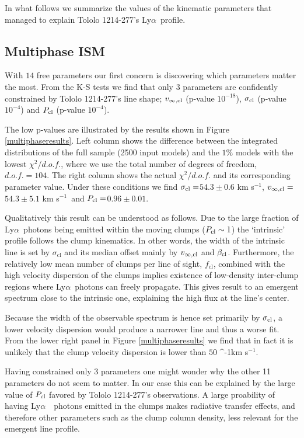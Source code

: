 \documentclass[a4paper,fleqn,usenatbib]{mnras}
\newcommand{\tol}{Tololo 1214-277}
\newcommand{\lya}{\ifmmode{{\rm Ly}\alpha}\else Ly$\alpha$\ \fi}
\newcommand{\kms}{\ifmmode\mathrm{km\ s}^{-1}\else km s$^{-1}$\fi}
\newcommand{\sigmaclump}{$54.3\pm 0.6$ km s$^{-1}$}
\newcommand{\inftyclump}{$54.3\pm 5.1$ km s$^{-1}$}
\newcommand{\probaclump}{$0.96\pm 0.01$}
\begin{document}
In what follows we summarize the values of the kinematic parameters
that managed to explain \tol's \lya profile.


\subsection{Multiphase ISM}

With $14$ free parameters our first concern is discovering which 
parameters matter the most.
From the K-S tests we find that only 3 parameters 
are confidently constrained by \tol's line shape;
$v_{\infty,\rm{cl}}$ (p-value  $10^{-18}$), $\sigma_{\rm cl}$ (p-value
$10^{-4}$) and $P_{\rm cl}$ (p-value $10^{-4}$). 

The low p-values are illustrated by the results shown in Figure \ref{multiphaseresults}.
Left column shows the difference between the integrated distributions
of the full sample (2500 input models) and the $1\%$ models with the lowest
$\chi^2/d.o.f.$, where we use the total number of degrees of freedom,
$d.o.f.=104$. 
The right column shows the actual $\chi^2/d.o.f.$ 
and its corresponding parameter value. 
Under these conditions we find $\sigma_{\rm cl}=$\sigmaclump,
$v_{\infty {\rm, cl}}=$\inftyclump\ and $P_{\rm cl}=$\probaclump.

Qualitatively this result can be understood as follows.
Due to the large fraction of \lya photons being emitted within the
moving clumps ($P_{\rm cl}\sim 1$) the `intrinsic' profile follows 
the clump kinematics. In other words, the width of the intrinsic line
is set by $\sigma_{\mathrm{cl}}$ and its median offset mainly by
$v_{\infty,{\rm cl}}$ and $\beta_{\rm cl}$.
Furthermore, the relatively low mean number of clumps per line of
sight, $f_{\mathrm{cl}}$, combined with the high velocity dispersion
of the clumps implies existence of low-density inter-clump 
regions where \lya photons can freely propagate.
This gives result to an emergent spectrum close to the intrinsic one, explaining the high
flux at the line's center.  

Because the width of the observable spectrum is hence set primarily by
$\sigma_{\rm cl}$, a lower velocity dispersion would produce a
narrower line and thus a worse fit. 
From the lower right panel in Figure \ref{multiphaseresults} we find
that in fact it is unlikely that the clump velocity dispersion is
lower than $50$ \kms. 

Having constrained only 3 parameters one might wonder why the other 11
parameters do not seem to matter.
In our case this can be explained by the large value of $P_{\rm cl}$
favored by \tol's observations. 
A large proability of having \lya\ photons emitted in the clumps
makes radiative transfer effects, and therefore other parameters such
as the clump column density, less relevant for the emergent line
profile. 
\end{document}
